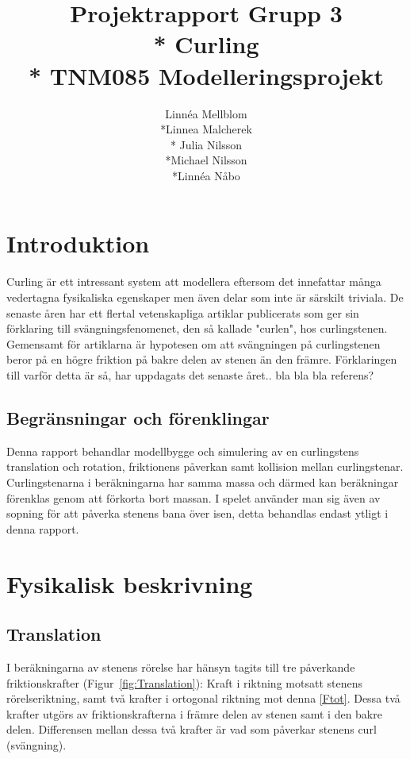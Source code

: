 \documentclass[11pt]{article} %
\title{Projektrapport Grupp 3 \\* 
Curling\\*
TNM085 Modelleringsprojekt}
\author{Linnéa Mellblom\\*Linnea Malcherek\\* Julia Nilsson\\*Michael Nilsson\\*Linnéa Nåbo}
\begin{document}
\maketitle
\pagebreak
{}  

\pagebreak
\tableofcontents
\pagebreak

\section{Introduktion}
Curling är ett intressant system att modellera eftersom det innefattar många vedertagna fysikaliska egenskaper men även delar som inte är särskilt triviala. 
De senaste åren har ett flertal vetenskapliga artiklar publicerats som ger sin förklaring till svängningsfenomenet, den så kallade "curlen", hos curlingstenen.
Gemensamt för artiklarna är hypotesen om att svängningen på curlingstenen beror på en högre friktion på bakre delen av stenen än den främre. 
Förklaringen till varför detta är så, har uppdagats det senaste året.. bla bla bla referens?

\subsection{Begränsningar och förenklingar} 
 Denna rapport behandlar modellbygge och simulering av en curlingstens translation och rotation, friktionens påverkan samt kollision mellan curlingstenar. 
Curlingstenarna i beräkningarna har samma massa och därmed kan beräkningar förenklas genom att förkorta bort massan. 
I spelet använder man sig även av sopning för att påverka stenens bana över isen, detta behandlas endast ytligt i denna rapport. 

\section{Fysikalisk beskrivning} 

\subsection{Translation}

I beräkningarna av stenens rörelse har hänsyn tagits till tre påverkande friktionskrafter (Figur~\ref{fig:Translation}): Kraft i riktning motsatt stenens rörelseriktning, samt två krafter i ortogonal riktning mot denna \eqref{Ftot}. Dessa två krafter utgörs av friktionskrafterna i främre delen av stenen samt i den bakre delen. Differensen mellan dessa två krafter är vad som påverkar stenens curl (svängning). 
\end{document}
